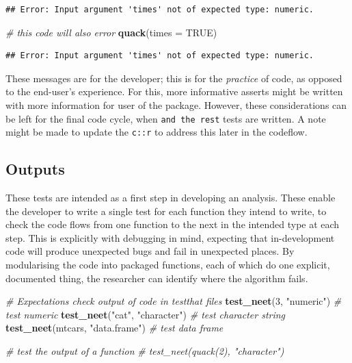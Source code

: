 \documentclass[
]{article}
\newenvironment{Shaded}{\begin{snugshade}}{\end{snugshade}}
\newcommand{\CommentTok}[1]{\textcolor[rgb]{0.56,0.35,0.01}{\textit{#1}}}
\newcommand{\DataTypeTok}[1]{\textcolor[rgb]{0.13,0.29,0.53}{#1}}
\newcommand{\DecValTok}[1]{\textcolor[rgb]{0.00,0.00,0.81}{#1}}
\newcommand{\KeywordTok}[1]{\textcolor[rgb]{0.13,0.29,0.53}{\textbf{#1}}}
\newcommand{\NormalTok}[1]{#1}
\newcommand{\OtherTok}[1]{\textcolor[rgb]{0.56,0.35,0.01}{#1}}
\newcommand{\StringTok}[1]{\textcolor[rgb]{0.31,0.60,0.02}{#1}}
\begin{document}
\begin{verbatim}
## Error: Input argument 'times' not of expected type: numeric.
\end{verbatim}

\begin{Shaded}
\begin{Highlighting}[]
\CommentTok{\# this code will also error}
\KeywordTok{quack}\NormalTok{(}\DataTypeTok{times =} \OtherTok{TRUE}\NormalTok{)}
\end{Highlighting}
\end{Shaded}

\begin{verbatim}
## Error: Input argument 'times' not of expected type: numeric.
\end{verbatim}

These messages are for the developer; this is for the \emph{practice} of code, as opposed to the end-user's experience. For this, more informative asserts might be written with more information for user of the package. However, these considerations can be left for the final code cycle, when \texttt{and\ the\ rest} tests are written. A note might be made to update the \texttt{c::r} to address this later in the codeflow.

\hypertarget{outputs}{%
\subsection{Outputs}\label{outputs}}

These tests are intended as a first step in developing an analysis. These enable the developer to write a single test for each function they intend to write, to check the code flows from one function to the next in the intended type at each step. This is explicitly with debugging in mind, expecting that in-development code will produce unexpected bugs and fail in unexpected places. By modularising the code into packaged functions, each of which do one explicit, documented thing, the researcher can identify where the algorithm fails.

\begin{Shaded}
\begin{Highlighting}[]
\CommentTok{\# Expectations check output of code in testthat files}
\KeywordTok{test\_neet}\NormalTok{(}\DecValTok{3}\NormalTok{, }\StringTok{"numeric"}\NormalTok{) }\CommentTok{\# test numeric}
\KeywordTok{test\_neet}\NormalTok{(}\StringTok{"cat"}\NormalTok{, }\StringTok{"character"}\NormalTok{) }\CommentTok{\# test character string}
\KeywordTok{test\_neet}\NormalTok{(mtcars, }\StringTok{"data.frame"}\NormalTok{) }\CommentTok{\# test data frame}

\CommentTok{\# test the output of a function}
\CommentTok{\# test\_neet(quack(2), "character")}
\end{Highlighting}
\end{Shaded}
\end{document}
